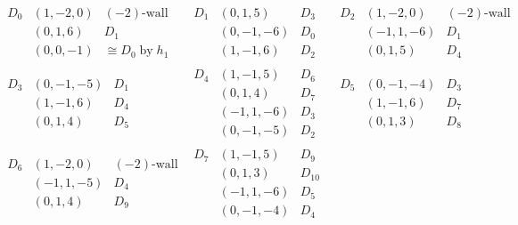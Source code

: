 $$
\renewcommand{\arraycolsep}{4pt}
\begin{array}{lll}
\begin{array}{lll}
D_{0} &(1,-2,0) &\textrm{$(-2)$-wall}\\ 
   &(0,1,6) &D_{1}\\ 
   &(0,0,-1) &\cong D_{0}\;\textrm{by}\; h_{1}
\end{array}
&
\begin{array}{lll}
D_{1} &(0,1,5) &D_{3}\\ 
   &(0,-1,-6) &\textrm{$D_{0}$}\\ 
   &(1,-1,6) &D_{2}
\end{array}
&
\begin{array}{lll}
D_{2} &(1,-2,0) &\textrm{$(-2)$-wall}\\ 
   &(-1,1,-6) &\textrm{$D_{1}$}\\ 
   &(0,1,5) &D_{4}
\end{array}
\\ 
\hline
\begin{array}{lll}
D_{3} &(0,-1,-5) &\textrm{$D_{1}$}\\ 
   &(1,-1,6) &D_{4}\\ 
   &(0,1,4) &D_{5}
\end{array}
&
\begin{array}{lll}
D_{4} &(1,-1,5) &D_{6}\\ 
   &(0,1,4) &D_{7}\\ 
   &(-1,1,-6) &D_{3}\\ 
   &(0,-1,-5) &\textrm{$D_{2}$}
\end{array}
&
\begin{array}{lll}
D_{5} &(0,-1,-4) &\textrm{$D_{3}$}\\ 
   &(1,-1,6) &D_{7}\\ 
   &(0,1,3) &D_{8}
\end{array}
\\ 
\hline
\begin{array}{lll}
D_{6} &(1,-2,0) &\textrm{$(-2)$-wall}\\ 
   &(-1,1,-5) &\textrm{$D_{4}$}\\ 
   &(0,1,4) &D_{9}
\end{array}
&
\begin{array}{lll}
D_{7} &(1,-1,5) &D_{9}\\ 
   &(0,1,3) &D_{10}\\ 
   &(-1,1,-6) &D_{5}\\ 
   &(0,-1,-4) &\textrm{$D_{4}$}

\end{array}
\end{array}$$
